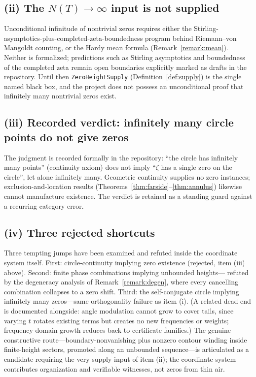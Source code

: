 \documentclass[submission]{jsfds}
\newcommand{\Lean}[1]{\texttt{#1}}
\begin{document}
\subsection*{(ii) The $N(T)\to\infty$ input is not supplied}
Unconditional infinitude of nontrivial zeros requires either the
Stirling-asymptotics-plus-completed-zeta-boundedness program behind
Riemann--von Mangoldt counting, or the Hardy mean formula
(Remark~\ref{remark:mean}). Neither is formalized; predictions such as
Stirling asymptotics and boundedness of the completed zeta remain open
boundaries explicitly marked as drafts in the repository. Until then
\Lean{ZeroHeightSupply} (Definition~\ref{def:supply}) is the single named
black box, and the project does not possess an unconditional proof that
infinitely many nontrivial zeros exist.

\subsection*{(iii) Recorded verdict: infinitely many circle points do not
give zeros}
The judgment is recorded formally in the repository: ``the circle has
infinitely many points'' (continuity axiom) does not imply ``$\zeta$ has a
single zero on the circle'', let alone infinitely many. Geometric continuity
supplies no zero instances; exclusion-and-location results
(Theorems~\ref{thm:farside}--\ref{thm:annulus}) likewise cannot manufacture
existence. The verdict is retained as a standing guard against a recurring
category error.

\subsection*{(iv) Three rejected shortcuts}
Three tempting jumps have been examined and refuted inside the coordinate
system itself. First: circle-continuity implying zero existence (rejected, item
(iii) above). Second: finite phase combinations implying unbounded heights---
refuted by the degeneracy analysis of Remark~\ref{remark:degen}, where every
cancelling combination collapses to a zero shift. Third: the self-conjugate
circle implying infinitely many zeros---same orthogonality failure as item (i).
(A related dead end is documented alongside: angle modulation cannot grow to
cover tails, since varying $t$ rotates existing terms but creates no new
frequencies or weights; frequency-domain growth reduces back to certificate
families.) The genuine constructive route---boundary-nonvanishing plus nonzero
contour winding inside finite-height sectors, promoted along an unbounded
sequence---is articulated as a candidate requiring the very supply input of
item (ii); the coordinate system contributes organization and verifiable
witnesses, not zeros from thin air.
\end{document}
